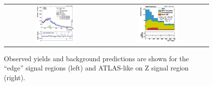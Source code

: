 \documentclass{article}
\begin{document}
\begin{figure}[!htb]
\begin{center}
\begin{tabular}{cc}
\includegraphics[width=0.4\textwidth]{edge_mll.pdf} &
\includegraphics[width=0.4\textwidth]{MET_ATLAS_SR.pdf}
\end{tabular}
\caption{
\label{fig:2leposresults}
Observed yields and background predictions are shown for the ``edge'' signal regions (left) and ATLAS-like on Z signal region (right).
}
\end{center}
\end{figure}








%

\end{document}
